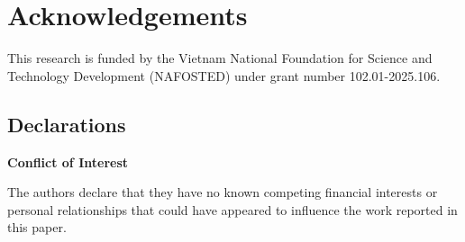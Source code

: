 \documentclass[pdflatex]{sn-jnl}
\begin{document}
\section*{Acknowledgements}
	This research is funded by the Vietnam National Foundation for Science and Technology Development (NAFOSTED) under grant number 102.01-2025.106.
		
		\newpage	
		\begin{appendices}
		\section*{Declarations}

\textbf{Conflict of Interest}

The authors declare that they have no known competing financial interests or personal relationships that could have appeared to influence the work reported in this paper.


			
		
		\end{appendices}
\end{document}
